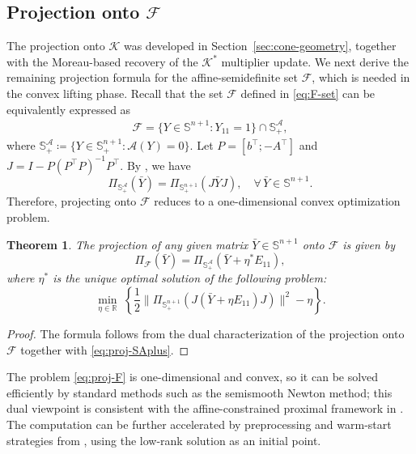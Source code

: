\documentclass[11pt]{article}
\def\A{\mathcal{A}}
\def\K{\mathcal{K}}
\def\F{\mathcal{F}}
\def\R{\mathbb{R}}
\def\S{\mathbb{S}}
\theoremstyle{plain}
\newtheorem{theorem}{Theorem}
\begin{document}
\subsection{Projection onto \texorpdfstring{$\F$}{F}}\label{subsec:projection-F}
 
The projection onto $\K$ was developed in Section~\ref{sec:cone-geometry}, together with the Moreau-based recovery of the $\K^*$ multiplier update. We next derive the remaining projection formula for the affine-semidefinite set $\F$, which is needed in the convex lifting phase.
Recall that the set $\F$ defined in \eqref{eq:F-set} can be equivalently expressed as
\begin{align*}
   \F 
   =  \{Y\in\S^{n+1}: Y_{11}=1\}\cap\S^{\A}_{+},
\end{align*}
where $\S^{\A}_{+}\coloneqq\{Y\in\S^{n+1}_+:\A(Y)=0\}$.
Let $P =[b^\top;-A^\top]$ and $J=I-P(P^\top P)^{-1}P^\top$.
By \cite[Lemma 2]{RiNNALplus}, we have
\begin{equation}
    \label{eq:proj-SAplus}
    \Pi_{\S^{\A}_{+}}(\bar Y)=\Pi_{\S^{n+1}_+}(J\bar YJ), \quad \forall\, \bar Y\in\S^{n+1}.
\end{equation}
Therefore, projecting onto $\F$ reduces to a one-dimensional convex optimization problem.
\begin{theorem}
    \label{thm:projection-F}
    The projection of any given matrix $\bar Y\in \S^{n+1}$ onto $\F$ is given by
    \[
\Pi_{\F}(\bar Y)=\Pi_{\S^{\A}_{+}}(\bar Y+\eta^* E_{11}),
    \]
where $\eta^*$ is the unique optimal solution of the following problem:
    \begin{equation}
        \label{eq:proj-F}
        \min_{\eta\in\R}\;\left\{\frac{1}{2}\|\Pi_{\S^{n+1}_+}(J(\bar Y+ \eta E_{11})J)\|^2-\eta\right\}.
    \end{equation}
\end{theorem}

\begin{proof}\;
    The formula follows from the dual characterization of the projection onto $\F$ together with \eqref{eq:proj-SAplus}.
\end{proof}



The problem \eqref{eq:proj-F} is one-dimensional and convex, so it can be solved efficiently by standard methods such as the semismooth Newton method; this dual viewpoint is consistent with the affine-constrained proximal framework in \cite{hou2026efficient}. The computation can be further accelerated by preprocessing and warm-start strategies from \cite{RiNNALplus}, using the low-rank solution as an initial point.
\end{document}
